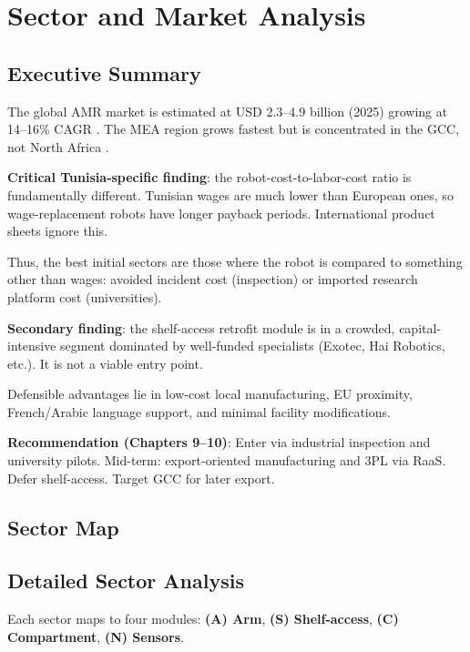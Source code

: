 \chapter{Sector and Market Analysis}

\section{Executive Summary}

The global AMR market is estimated at USD 2.3--4.9 billion (2025) growing at 14--16\% CAGR \cite{valuates_agv_amr}. The MEA region grows fastest but is concentrated in the GCC, not North Africa \cite{grandview_mea}.

\textbf{Critical Tunisia-specific finding}: the robot-cost-to-labor-cost ratio is fundamentally different. Tunisian wages are much lower than European ones, so wage-replacement robots have longer payback periods. International product sheets ignore this.

Thus, the best initial sectors are those where the robot is compared to something other than wages: avoided incident cost (inspection) or imported research platform cost (universities).

\textbf{Secondary finding}: the shelf-access retrofit module is in a crowded, capital-intensive segment dominated by well-funded specialists (Exotec, Hai Robotics, etc.). It is not a viable entry point.

Defensible advantages lie in low-cost local manufacturing, EU proximity, French/Arabic language support, and minimal facility modifications.

\textbf{Recommendation (Chapters 9--10)}: Enter via industrial inspection and university pilots. Mid-term: export-oriented manufacturing and 3PL via RaaS. Defer shelf-access. Target GCC for later export.

\section{Sector Map}



\section{Detailed Sector Analysis}

Each sector maps to four modules: \textbf{(A) Arm}, \textbf{(S) Shelf-access}, \textbf{(C) Compartment}, \textbf{(N) Sensors}.


